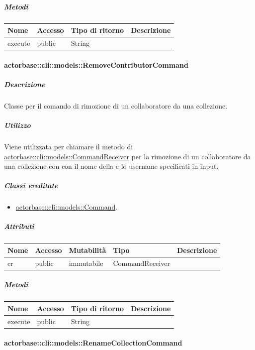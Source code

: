 \documentclass{scalatekids-article}
\begin{document}
\subparagraph{Metodi}

\begin{tabular}{| l | l | l | l |}
	\hline
	Nome & Accesso & Tipo di ritorno & Descrizione\\
	\hline
	execute & public & String & \\
	\hline
\end{tabular}

\paragraph{actorbase::cli::models::RemoveContributorCommand}
\label{sec:actorbase::cli::models::RemoveContributorCommand}

\subparagraph{Descrizione}

Classe per il comando di rimozione di un collaboratore da una collezione.

\subparagraph{Utilizzo}

Viene utilizzata per chiamare il metodo di
\hyperref[sec:actorbase::cli::models::CommandReceiver]{actorbase::cli::models::CommandReceiver} per la rimozione di un collaboratore
da una collezione con con il nome della  e lo username
specificati in input.

\subparagraph{Classi ereditate}

\begin{itemize}
\item \hyperref[sec:actorbase::cli::models::Command]{actorbase::cli::models::Command}.
\end{itemize}

\subparagraph{Attributi}

\begin{tabular}{| l | l | l | l | l |}
	\hline
	Nome & Accesso & Mutabilità & Tipo & Descrizione\\
	\hline
	cr & public & immutabile & CommandReceiver & \\
	\hline
\end{tabular}

\subparagraph{Metodi}

\begin{tabular}{| l | l | l | l |}
	\hline
	Nome & Accesso & Tipo di ritorno & Descrizione\\
	\hline
	execute & public & String & \\
	\hline
\end{tabular}

\paragraph{actorbase::cli::models::RenameCollectionCommand}
\label{sec:actorbase::cli::models::RenameCollectionCommand}
\end{document}
